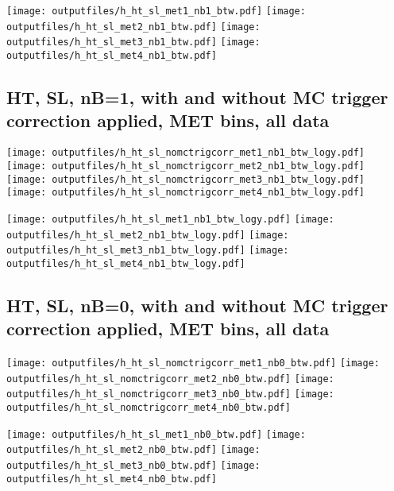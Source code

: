 \documentclass[11pt]{article}
\begin{document}
    \noindent
     \texttt{[image: outputfiles/h\_ht\_sl\_met1\_nb1\_btw.pdf]}
     \texttt{[image: outputfiles/h\_ht\_sl\_met2\_nb1\_btw.pdf]}
     \texttt{[image: outputfiles/h\_ht\_sl\_met3\_nb1\_btw.pdf]}
     \texttt{[image: outputfiles/h\_ht\_sl\_met4\_nb1\_btw.pdf]}

   \clearpage
     \subsection{ HT, SL, nB=1, with and without MC trigger correction applied, MET bins, all data}

    \noindent
     \texttt{[image: outputfiles/h\_ht\_sl\_nomctrigcorr\_met1\_nb1\_btw\_logy.pdf]}
     \texttt{[image: outputfiles/h\_ht\_sl\_nomctrigcorr\_met2\_nb1\_btw\_logy.pdf]}
     \texttt{[image: outputfiles/h\_ht\_sl\_nomctrigcorr\_met3\_nb1\_btw\_logy.pdf]}
     \texttt{[image: outputfiles/h\_ht\_sl\_nomctrigcorr\_met4\_nb1\_btw\_logy.pdf]}

    \noindent
     \texttt{[image: outputfiles/h\_ht\_sl\_met1\_nb1\_btw\_logy.pdf]}
     \texttt{[image: outputfiles/h\_ht\_sl\_met2\_nb1\_btw\_logy.pdf]}
     \texttt{[image: outputfiles/h\_ht\_sl\_met3\_nb1\_btw\_logy.pdf]}
     \texttt{[image: outputfiles/h\_ht\_sl\_met4\_nb1\_btw\_logy.pdf]}

   \clearpage
     \subsection{ HT, SL, nB=0, with and without MC trigger correction applied, MET bins, all data}

    \noindent
     \texttt{[image: outputfiles/h\_ht\_sl\_nomctrigcorr\_met1\_nb0\_btw.pdf]}
     \texttt{[image: outputfiles/h\_ht\_sl\_nomctrigcorr\_met2\_nb0\_btw.pdf]}
     \texttt{[image: outputfiles/h\_ht\_sl\_nomctrigcorr\_met3\_nb0\_btw.pdf]}
     \texttt{[image: outputfiles/h\_ht\_sl\_nomctrigcorr\_met4\_nb0\_btw.pdf]}

    \noindent
     \texttt{[image: outputfiles/h\_ht\_sl\_met1\_nb0\_btw.pdf]}
     \texttt{[image: outputfiles/h\_ht\_sl\_met2\_nb0\_btw.pdf]}
     \texttt{[image: outputfiles/h\_ht\_sl\_met3\_nb0\_btw.pdf]}
     \texttt{[image: outputfiles/h\_ht\_sl\_met4\_nb0\_btw.pdf]}
\end{document}
